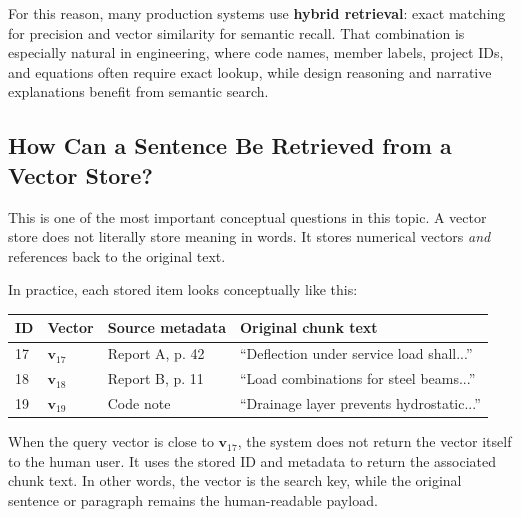 \documentclass[12pt]{article}
\begin{document}
For this reason, many production systems use \textbf{hybrid retrieval}: exact matching for precision and vector similarity for semantic recall. That combination is especially natural in engineering, where code names, member labels, project IDs, and equations often require exact lookup, while design reasoning and narrative explanations benefit from semantic search.

\subsection{How Can a Sentence Be Retrieved from a Vector Store?}

This is one of the most important conceptual questions in this topic. A vector store does not literally store meaning in words. It stores numerical vectors \emph{and} references back to the original text.

In practice, each stored item looks conceptually like this:
\begin{center}
\begin{tabular}{llll}
\toprule
ID & Vector & Source metadata & Original chunk text \\
\midrule
17 & $\mathbf{v}_{17}$ & Report A, p. 42 & ``Deflection under service load shall...'' \\
18 & $\mathbf{v}_{18}$ & Report B, p. 11 & ``Load combinations for steel beams...'' \\
19 & $\mathbf{v}_{19}$ & Code note & ``Drainage layer prevents hydrostatic...'' \\
\bottomrule
\end{tabular}
\end{center}

When the query vector is close to $\mathbf{v}_{17}$, the system does not return the vector itself to the human user. It uses the stored ID and metadata to return the associated chunk text. In other words, the vector is the search key, while the original sentence or paragraph remains the human-readable payload.
\end{document}
